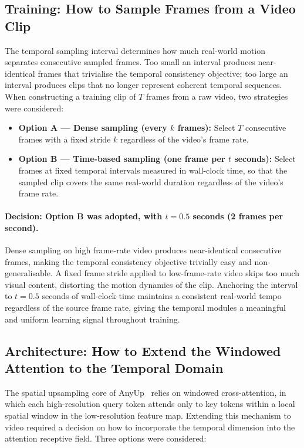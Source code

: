 \subsection{Training: How to Sample Frames from a Video Clip}

The temporal sampling interval determines how much real-world motion separates
consecutive sampled frames. Too small an interval produces near-identical frames
that trivialise the temporal consistency objective; too large an interval produces
clips that no longer represent coherent temporal sequences. When constructing a
training clip of $T$ frames from a raw video, two strategies were considered:

\begin{itemize}
    \item \textbf{Option A --- Dense sampling (every $k$ frames):} Select $T$ 
    consecutive frames with a fixed stride $k$ regardless of the video's frame 
    rate.
    \item \textbf{Option B --- Time-based sampling (one frame per $t$ seconds):} 
    Select frames at fixed temporal intervals measured in wall-clock time, so 
    that the sampled clip covers the same real-world duration regardless of the 
    video's frame rate.
\end{itemize}

\paragraph{Decision: Option B was adopted, with $t = 0.5$ seconds (2 frames per second).}
Dense sampling on high frame-rate video produces near-identical consecutive frames,
making the temporal consistency objective trivially easy and non-generalisable. A
fixed frame stride applied to low-frame-rate video skips too much visual content,
distorting the motion dynamics of the clip. Anchoring the interval to $t = 0.5$
seconds of wall-clock time maintains a consistent real-world tempo regardless of
the source frame rate, giving the temporal modules a meaningful and uniform learning
signal throughout training.

\subsection{Architecture: How to Extend the Windowed Attention to the Temporal 
Domain}

The spatial upsampling core of AnyUp~\cite{anyup} relies on windowed cross-attention, in which 
each high-resolution query token attends only to key tokens within a local spatial 
window in the low-resolution feature map. Extending this mechanism to video 
required a decision on how to incorporate the temporal dimension into the attention 
receptive field. Three options were considered:

